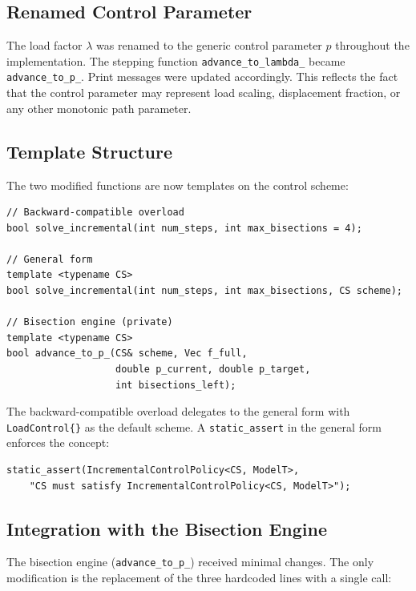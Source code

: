 \subsection{Renamed Control Parameter}
\label{ssec:ic-rename}

The load factor $\lambda$ was renamed to the generic control parameter
$p$ throughout the implementation.  The stepping function
\texttt{advance\_to\_lambda\_} became \texttt{advance\_to\_p\_}.
Print messages were updated accordingly.  This reflects the fact that
the control parameter may represent load scaling, displacement fraction,
or any other monotonic path parameter.

\subsection{Template Structure}
\label{ssec:ic-template}

The two modified functions are now templates on the control scheme:

\begin{lstlisting}
// Backward-compatible overload
bool solve_incremental(int num_steps, int max_bisections = 4);

// General form
template <typename CS>
bool solve_incremental(int num_steps, int max_bisections, CS scheme);

// Bisection engine (private)
template <typename CS>
bool advance_to_p_(CS& scheme, Vec f_full,
                   double p_current, double p_target,
                   int bisections_left);
\end{lstlisting}

The backward-compatible overload delegates to the general form with
\texttt{LoadControl\{\}} as the default scheme.  A \texttt{static\_assert}
in the general form enforces the concept:

\begin{lstlisting}
static_assert(IncrementalControlPolicy<CS, ModelT>,
    "CS must satisfy IncrementalControlPolicy<CS, ModelT>");
\end{lstlisting}

\subsection{Integration with the Bisection Engine}
\label{ssec:ic-bisection}

The bisection engine (\texttt{advance\_to\_p\_}) received minimal
changes.  The only modification is the replacement of the three
hardcoded lines with a single call:

